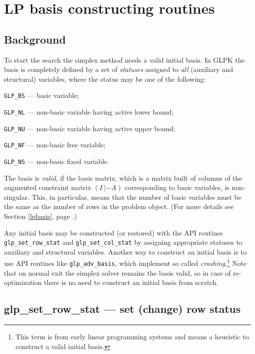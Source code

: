 
\newpage

\section{LP basis constructing routines}

\subsection{Background}

To start the search the simplex method needs a valid initial basis.
In GLPK the basis is completely defined by a set of {\it statuses}
assigned to {\it all} (auxiliary and structural) variables, where the
status may be one of the following:

\verb|GLP_BS| --- basic variable;

\verb|GLP_NL| --- non-basic variable having active lower bound;

\verb|GLP_NU| --- non-basic variable having active upper bound;

\verb|GLP_NF| --- non-basic free variable;

\verb|GLP_NS| --- non-basic fixed variable.

The basis is {\it valid}, if the basis matrix, which is a matrix built
of columns of the augmented constraint matrix $(I\:|-A)$ corresponding
to basic variables, is non-singular. This, in particular, means that
the number of basic variables must be the same as the number of rows in
the problem object. (For more details see Section \ref{lpbasis}, page
\pageref{lpbasis}.)

Any initial basis may be constructed (or restored) with the API
routines \verb|glp_set_row_stat| and \verb|glp_set_col_stat| by
assigning appropriate statuses to auxiliary and structural variables.
Another way to construct an initial basis is to use API routines like
\verb|glp_adv_basis|, which implement so called
{\it crashing}.\footnote{This term is from early linear programming
systems and means a heuristic to construct a valid initial basis.} Note
that on normal exit the simplex solver remains the basis valid, so in
case of re-optimization there is no need to construct an initial basis
from scratch.

\subsection{glp\_set\_row\_stat --- set (change) row status}

